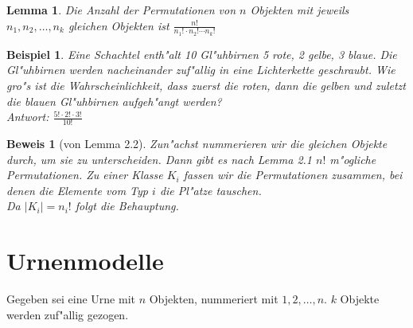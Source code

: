 \documentclass[a4paper,11pt]{book}
\newtheorem{Lem}[Sa]{Lemma}
\newtheorem{Bsp}{Beispiel}[chapter]
\theoremstyle{nonumberplain}
\newtheorem{Bew}{Beweis}
\begin{document}
\begin{Lem}
Die Anzahl der Permutationen von $n$ Objekten mit jeweils $n_1,n_2,\ldots,n_k$ gleichen Objekten ist $\frac{n!}{n_1!\cdot n_2!\cdots n_k!}$
\end{Lem}

\begin{Bsp}
Eine Schachtel enth"alt 10 Gl"uhbirnen 5 rote, 2 gelbe, 3 blaue. Die Gl"uhbirnen werden nacheinander zuf"allig in eine Lichterkette geschraubt. Wie gro"s ist die Wahrscheinlichkeit, dass zuerst die roten, dann die gelben und zuletzt die blauen Gl"uhbirnen aufgeh"angt werden?\\
Antwort: $\frac{5!\cdot 2!\cdot 3!}{10!}$
\end{Bsp}

\begin{Bew}[von Lemma 2.2]
Zun"achst nummerieren wir die gleichen Objekte durch, um sie zu unterscheiden. Dann gibt es nach Lemma 2.1 $n!$ m"ogliche Permutationen. Zu einer Klasse $K_i$ fassen wir die Permutationen zusammen, bei denen die Elemente vom Typ $i$ die Pl"atze tauschen.\\
Da $|K_i|=n_i!$ folgt die Behauptung.
\end{Bew}

\section{Urnenmodelle}
Gegeben sei eine Urne mit $n$ Objekten, nummeriert mit $1,2,\ldots,n$. $k$ Objekte werden zuf"allig gezogen.
\end{document}
